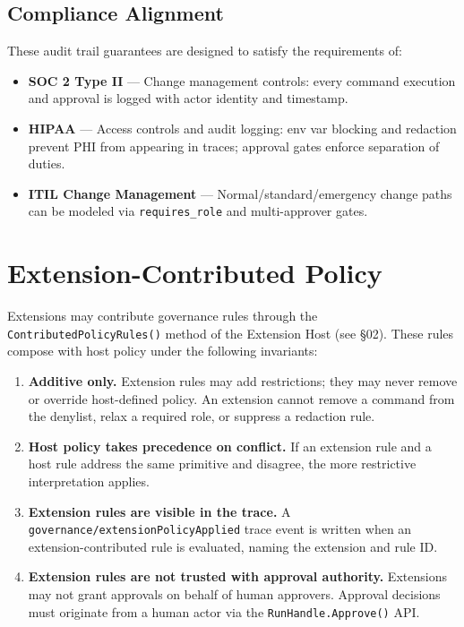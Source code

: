 \subsection{Compliance Alignment}

These audit trail guarantees are designed to satisfy the requirements of:
\begin{itemize}
  \item \textbf{SOC 2 Type II} — Change management controls: every command execution and
        approval is logged with actor identity and timestamp.
  \item \textbf{HIPAA} — Access controls and audit logging: env var blocking and redaction
        prevent PHI from appearing in traces; approval gates enforce separation of duties.
  \item \textbf{ITIL Change Management} — Normal/standard/emergency change paths can be
        modeled via \texttt{requires\_role} and multi-approver gates.
\end{itemize}

\section{Extension-Contributed Policy}

Extensions may contribute governance rules through the \texttt{ContributedPolicyRules()}
method of the Extension Host (see §02). These rules compose with host policy under the
following invariants:

\begin{enumerate}
  \item \textbf{Additive only.} Extension rules may add restrictions; they may never
        remove or override host-defined policy. An extension cannot remove a command
        from the denylist, relax a required role, or suppress a redaction rule.
  \item \textbf{Host policy takes precedence on conflict.} If an extension rule and a
        host rule address the same primitive and disagree, the more restrictive interpretation
        applies.
  \item \textbf{Extension rules are visible in the trace.} A
        \texttt{governance/extensionPolicyApplied} trace event is written when an
        extension-contributed rule is evaluated, naming the extension and rule ID.
  \item \textbf{Extension rules are not trusted with approval authority.} Extensions may
        not grant approvals on behalf of human approvers. Approval decisions must originate
        from a human actor via the \texttt{RunHandle.Approve()} API.
\end{enumerate}

